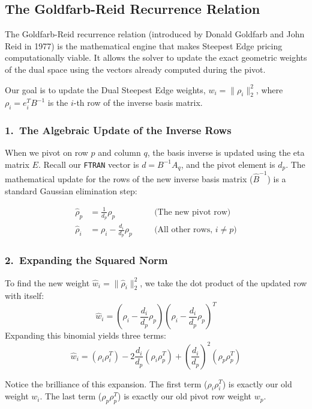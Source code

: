 \documentclass[11pt, a4paper]{article}
\begin{document}
\subsection{The Goldfarb-Reid Recurrence Relation}

The Goldfarb-Reid recurrence relation (introduced by Donald Goldfarb and John Reid in 1977) is the mathematical engine that makes Steepest Edge pricing computationally viable. It allows the solver to update the exact geometric weights of the dual space using the vectors already computed during the pivot.

Our goal is to update the Dual Steepest Edge weights, $w_i = \|\rho_i\|_2^2$, where $\rho_i = e_i^T B^{-1}$ is the $i$-th row of the inverse basis matrix.

\subsubsection*{1.\ The Algebraic Update of the Inverse Rows}

When we pivot on row $p$ and column $q$, the basis inverse is updated using the eta matrix $E$. Recall our \texttt{FTRAN} vector is $d = B^{-1}A_q$, and the pivot element is $d_p$. The mathematical update for the rows of the new inverse basis matrix ($\hat{B}^{-1}$) is a standard Gaussian elimination step:

\begin{align*}
\hat{\rho}_p &= \frac{1}{d_p} \rho_p \quad &&\text{(The new pivot row)} \\
\hat{\rho}_i &= \rho_i - \frac{d_i}{d_p} \rho_p \quad &&\text{(All other rows, } i \neq p)
\end{align*}

\subsubsection*{2.\ Expanding the Squared Norm}

To find the new weight $\hat{w}_i = \|\hat{\rho}_i\|_2^2$, we take the dot product of the updated row with itself:
\[
\hat{w}_i = \left( \rho_i - \frac{d_i}{d_p} \rho_p \right) \left( \rho_i - \frac{d_i}{d_p} \rho_p \right)^T
\]
Expanding this binomial yields three terms:
\[
\hat{w}_i = (\rho_i \rho_i^T) - 2 \frac{d_i}{d_p} (\rho_i \rho_p^T) + \left(\frac{d_i}{d_p}\right)^2 (\rho_p \rho_p^T)
\]

Notice the brilliance of this expansion. The first term ($\rho_i \rho_i^T$) is exactly our old weight $w_i$. The last term ($\rho_p \rho_p^T$) is exactly our old pivot row weight $w_p$. 
\end{document}
